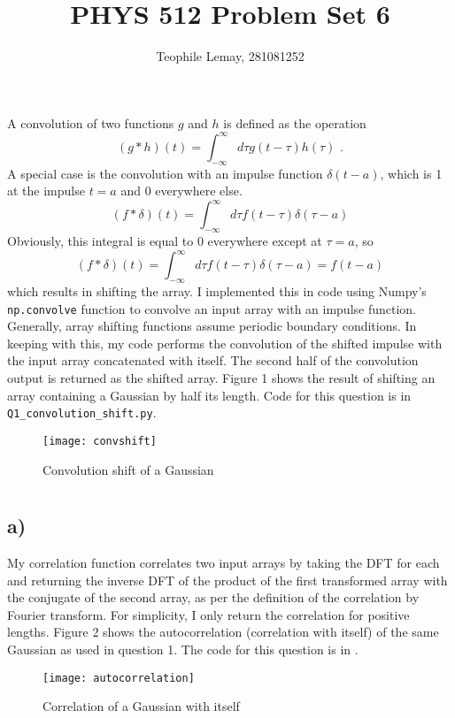 \documentclass{article}
\title{PHYS 512 Problem Set 6}
\author{Teophile Lemay, 281081252}
\date{}
\newcommand{\<}[1]{\left\langle #1 \right\rangle }
\begin{document}
\maketitle

\section{}
A convolution of two functions $g$ and $h$ is defined as the operation
\[(g * h)(t) = \int_{-\infty}^{\infty}d\tau g(t-\tau)h(\tau) \text{ .}\]
A special case is the convolution with an impulse function $\delta(t-a)$, which is 1 at the impulse $t=a$ and 0 everywhere else.
\[(f*\delta)(t) = \int_{-\infty}^{\infty}d\tau f(t-\tau)\delta(\tau-a)\]
Obviously, this integral is equal to 0 everywhere except at $\tau= a$, so
\[(f*\delta)(t) = \int_{-\infty}^{\infty}d\tau f(t-\tau)\delta(\tau-a) = f(t-a)\]
which results in shifting the array. I implemented this in code using Numpy's \texttt{np.convolve} function to convolve an input array with an impulse function. Generally, array shifting functions assume periodic boundary conditions. In keeping with this, my code performs the convolution of the shifted impulse with the input array concatenated with itself. The second half of the convolution output is returned as the shifted array. Figure 1 shows the result of shifting an array containing a Gaussian by half its length. Code for this question is in \texttt{Q1\_convolution\_shift.py}.
\begin{figure}[h]
	\caption{Convolution shift of a Gaussian}
	\centering
	\texttt{[image: convshift]}
\end{figure}

\section{}
\subsection{a)}
My correlation function correlates two input arrays by taking the DFT for each and returning the inverse DFT of the product of the first transformed array with the conjugate of the second array, as per the definition of the correlation by Fourier transform. For simplicity, I only return the correlation for positive lengths. Figure 2 shows the autocorrelation (correlation with itself) of the same Gaussian as used in question 1. The code for this question is in .
\begin{figure}[h]
	\caption{Correlation of a Gaussian with itself}
	\centering
	\texttt{[image: autocorrelation]}
\end{figure}
\end{document}
